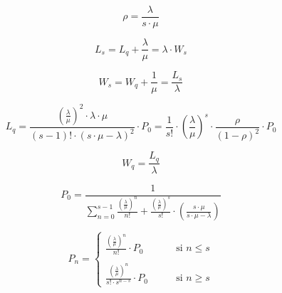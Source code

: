 \documentclass{templateNote}
\newcommand{\newparagraph}{\par\vspace{\baselineskip}\noindent}
\begin{document}
\begin{tcolorbox}[
    colframe=black!100, %
    colback=white!100,       %
    coltitle=white!100, %
    title=\textbf{M/M/S}, %
]
\begin{minipage}{0.15\textwidth}
    \begin{equation*}
        \rho = \frac{\lambda}{s \cdot \mu}
    \end{equation*}
\end{minipage}
\hfill
\begin{minipage}{0.25\textwidth}
    \begin{equation*}
        L_s = L_q + \frac{\lambda}{\mu} = \lambda \cdot W_s
    \end{equation*}
\end{minipage}
\hfill
\begin{minipage}{0.4\textwidth}
    \begin{equation*}
        W_s = W_q + \frac{1}{\mu} = \frac{L_s}{\lambda}
    \end{equation*}
\end{minipage}
\newparagraph
\begin{minipage}{0.7\textwidth}
    \begin{equation*}
        L_q = \frac{\left(\displaystyle\frac{\lambda}{\mu}\right)^2 \cdot \lambda \cdot \mu}{(s-1)! \cdot (s \cdot \mu - \lambda)^2} \cdot P_0 = \frac{1}{s!} \cdot \left(\frac{\lambda}{\mu}\right)^s \cdot \frac{\rho}{(1-\rho)^2} \cdot P_0
    \end{equation*}
\end{minipage}
\hfill
\begin{minipage}{0.2\textwidth}
    \begin{equation*}
        W_q = \frac{L_q}{\lambda}
    \end{equation*}
\end{minipage}
\newparagraph
\begin{minipage}{0.5\textwidth}
    \begin{equation*}
        P_0 = \frac{1}{\displaystyle\sum_{n=0}^{s-1}{\frac{\left(\frac{\lambda}{\mu}\right)^n}{n!} + \frac{\left(\frac{\lambda}{\mu}\right)^s}{s!} \cdot \left(\frac{s \cdot \mu}{s \cdot \mu - \lambda}\right)}}
    \end{equation*}
\end{minipage}
\hfill
\begin{minipage}{0.45\textwidth}
    \begin{equation*}
        P_n = \begin{cases}
            \displaystyle\frac{\left(\frac{\lambda}{\mu}\right)^n}{n!} \cdot P_0 & \qquad \text{si } n \leq s \\
            \\
            \displaystyle\frac{\left(\frac{\lambda}{\mu}\right)^n}{s! \cdot s^{n-s}} \cdot P_0 & \qquad \text{si } n \geq s
        \end{cases}
    \end{equation*}
\end{minipage}
\end{tcolorbox}
\end{document}
